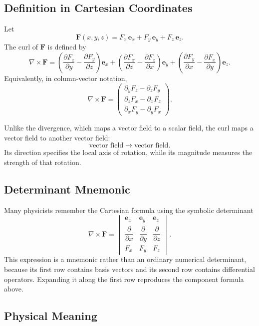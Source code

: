 \subsection{Definition in Cartesian Coordinates}

Let
\[
\mathbf F(x,y,z)
=
F_x\,\mathbf e_x+F_y\,\mathbf e_y+F_z\,\mathbf e_z.
\]
The curl of $\mathbf F$ is defined by
\[
\boxed{
\nabla\times\mathbf F
=
\left(
\frac{\partial F_z}{\partial y}-\frac{\partial F_y}{\partial z}
\right)\mathbf e_x
+
\left(
\frac{\partial F_x}{\partial z}-\frac{\partial F_z}{\partial x}
\right)\mathbf e_y
+
\left(
\frac{\partial F_y}{\partial x}-\frac{\partial F_x}{\partial y}
\right)\mathbf e_z.
}
\]
Equivalently, in column-vector notation,
\[
\boxed{
\nabla\times\mathbf F
=
\begin{pmatrix}
\partial_yF_z-\partial_zF_y\\[2mm]
\partial_zF_x-\partial_xF_z\\[2mm]
\partial_xF_y-\partial_yF_x
\end{pmatrix}.
}
\]

Unlike the divergence, which maps a vector field to a scalar field, the curl
maps a vector field to another vector field:
\[
\boxed{
\text{vector field}\longrightarrow\text{vector field}.
}
\]
Its direction specifies the local axis of rotation, while its magnitude measures
the strength of that rotation.

\subsection{Determinant Mnemonic}

Many physicists remember the Cartesian formula using the symbolic determinant
\[
\boxed{
\nabla\times\mathbf F
=
\begin{vmatrix}
\mathbf e_x & \mathbf e_y & \mathbf e_z\\[1mm]
\dfrac{\partial}{\partial x} &
\dfrac{\partial}{\partial y} &
\dfrac{\partial}{\partial z}\\[3mm]
F_x & F_y & F_z
\end{vmatrix}.
}
\]
This expression is a mnemonic rather than an ordinary numerical determinant,
because its first row contains basis vectors and its second row contains
differential operators. Expanding it along the first row reproduces the
component formula above.

\subsection{Physical Meaning}

